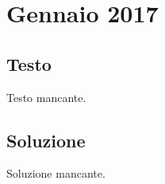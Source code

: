 \section{Gennaio 2017}

\subsection*{Testo}

Testo mancante.

\subsection*{Soluzione}

Soluzione mancante.

